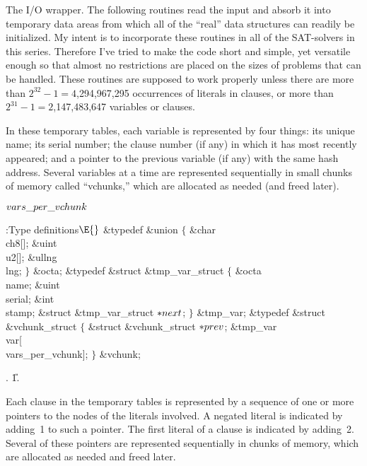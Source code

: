 The I/O wrapper. The following routines read the input
and absorb it into
temporary data areas from which all of the ``real'' data structures
can readily be initialized. My intent is to incorporate these routines in all
of the SAT-solvers in this series. Therefore I've tried to make the code
short and simple, yet versatile enough so that almost no restrictions are
placed on the sizes of problems that can be handled. These routines are
supposed to work properly unless there are more than
$2^{32}-1=4$,294,967,295 occurrences of literals in clauses,
or more than $2^{31}-1=2$,147,483,647 variables or clauses.

In these temporary tables, each variable is represented by four things:
its unique name; its serial number; the clause number (if any) in which it has
most recently appeared; and a pointer to the previous variable (if any)
with the same hash address. Several variables at a time
are represented sequentially in small chunks of memory called ``vchunks,''
which are allocated as needed (and freed later).

\Y\B\4\D$\\{vars\_per\_vchunk}$ \5
\par
\Y\B\4:Type definitions\X${}\E{}$\6
\&{typedef} \&{union} ${}\{{}$\1\6
\&{char} \\{ch8}[];\6
\&{uint} \\{u2}[];\6
\&{ullng} \\{lng};\2\6
${}\}{}$ \&{octa};\6
\&{typedef} \&{struct} \&{tmp\_var\_struct} ${}\{{}$\1\6
\&{octa} \\{name};\6
\&{uint} \\{serial};\6
\&{int} \\{stamp};\6
\&{struct} \&{tmp\_var\_struct} ${}{*}\\{next}{}$;\2%
\6
${}\}{}$ \&{tmp\_var};\7
\&{typedef} \&{struct} \&{vchunk\_struct} ${}\{{}$\1\6
\&{struct} \&{vchunk\_struct} ${}{*}\\{prev}{}$;\6
\&{tmp\_var} \\{var}[\\{vars\_per\_vchunk}];\2\6
${}\}{}$ \&{vchunk};\par
{}.
\U1.\fi

Each clause in the temporary tables is represented by a
sequence of
one or more pointers to the  nodes of the literals involved.
A negated literal is indicated by adding~1 to such a pointer.
The first literal of a clause is indicated by adding~2.
Several of these pointers are represented sequentially in chunks
of memory, which are allocated as needed and freed later.

